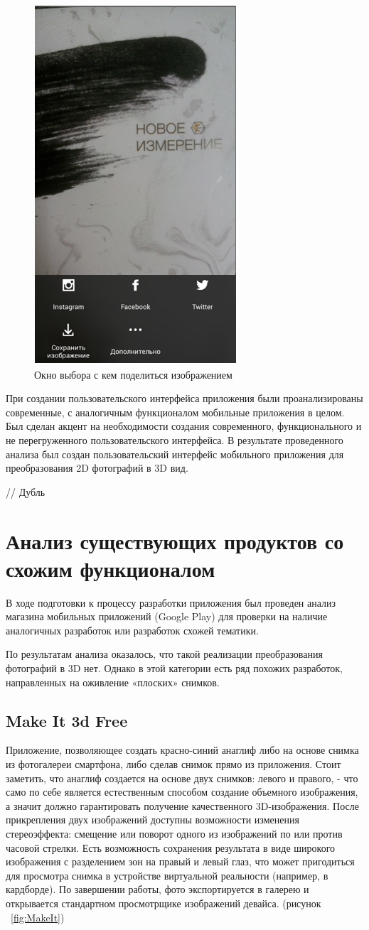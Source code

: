 \begin{figure}[H]
	\centering
	\includegraphics[width=0.3\linewidth]{pics/pod}
	\caption{Окно выбора с кем поделиться изображением}
	\label{fig:pod}
\end{figure}

При создании пользовательского интерфейса приложения были проанализированы современные, с аналогичным функционалом мобильные приложения в целом. Был сделан акцент на необходимости создания современного, функционального и не перегруженного пользовательского интерфейса. В результате проведенного анализа был создан пользовательский интерфейс мобильного приложения для преобразования 2D фотографий в 3D вид.



// Дубль

\section{Анализ существующих продуктов со схожим функционалом}
В ходе подготовки к процессу разработки приложения был проведен анализ магазина мобильных приложений (Google Play) для проверки на наличие аналогичных разработок или разработок схожей тематики.

По результатам анализа оказалось, что такой реализации преобразования фотографий в 3D нет. Однако в этой категории есть ряд похожих разработок, направленных на оживление «плоских» снимков. 

\subsection{Make It 3d Free}

Приложение, позволяющее создать красно-синий анаглиф либо на основе снимка из фотогалереи смартфона, либо сделав снимок прямо из приложения. Стоит заметить, что анаглиф создается на основе двух снимков:  левого и правого, - что само по себе является естественным способом создание объемного изображения, а значит должно гарантировать получение качественного 3D-изображения. После прикрепления двух изображений доступны возможности изменения стереоэффекта: смещение или поворот одного из изображений по или против часовой стрелки. Есть возможность сохранения результата в виде широкого изображения с разделением зон на правый и левый глаз, что может пригодиться для просмотра снимка в устройстве виртуальной реальности (например, в кардборде). По завершении работы, фото экспортируется в галерею и открывается стандартном просмотрщике изображений девайса. (рисунок ~\ref{fig:MakeIt})

